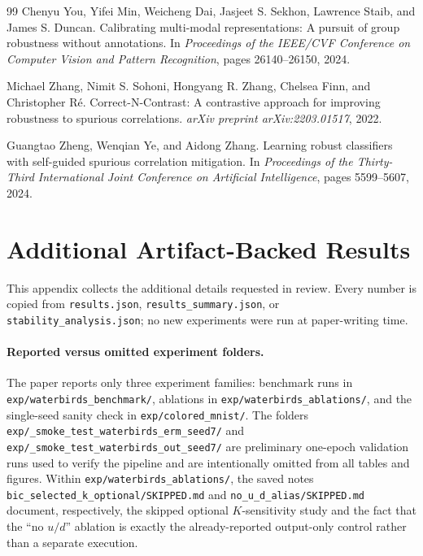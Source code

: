 \documentclass{article}
\begin{document}
\begin{thebibliography}{99}
Chenyu You, Yifei Min, Weicheng Dai, Jasjeet S. Sekhon, Lawrence Staib, and James S. Duncan.
\newblock Calibrating multi-modal representations: A pursuit of group robustness without annotations.
\newblock In \emph{Proceedings of the IEEE/CVF Conference on Computer Vision and Pattern Recognition}, pages 26140--26150, 2024.

Michael Zhang, Nimit S. Sohoni, Hongyang R. Zhang, Chelsea Finn, and Christopher R{\'e}.
\newblock Correct-N-Contrast: A contrastive approach for improving robustness to spurious correlations.
\newblock \emph{arXiv preprint arXiv:2203.01517}, 2022.

Guangtao Zheng, Wenqian Ye, and Aidong Zhang.
\newblock Learning robust classifiers with self-guided spurious correlation mitigation.
\newblock In \emph{Proceedings of the Thirty-Third International Joint Conference on Artificial Intelligence}, pages 5599--5607, 2024.

\end{thebibliography}

\appendix

\section{Additional Artifact-Backed Results}
\label{sec:appendix}

This appendix collects the additional details requested in review. Every number is copied from \texttt{results.json}, \texttt{results\_summary.json}, or \texttt{stability\_analysis.json}; no new experiments were run at paper-writing time.

\paragraph{Reported versus omitted experiment folders.}
The paper reports only three experiment families: benchmark runs in \texttt{exp/waterbirds\_benchmark/}, ablations in \texttt{exp/waterbirds\_ablations/}, and the single-seed sanity check in \texttt{exp/colored\_mnist/}. The folders \texttt{exp/\_smoke\_test\_waterbirds\_erm\_seed7/} and \texttt{exp/\_smoke\_test\_waterbirds\_out\_seed7/} are preliminary one-epoch validation runs used to verify the pipeline and are intentionally omitted from all tables and figures. Within \texttt{exp/waterbirds\_ablations/}, the saved notes \texttt{bic\_selected\_k\_optional/SKIPPED.md} and \texttt{no\_u\_d\_alias/SKIPPED.md} document, respectively, the skipped optional $K$-sensitivity study and the fact that the ``no $u/d$'' ablation is exactly the already-reported output-only control rather than a separate execution.
\end{document}
